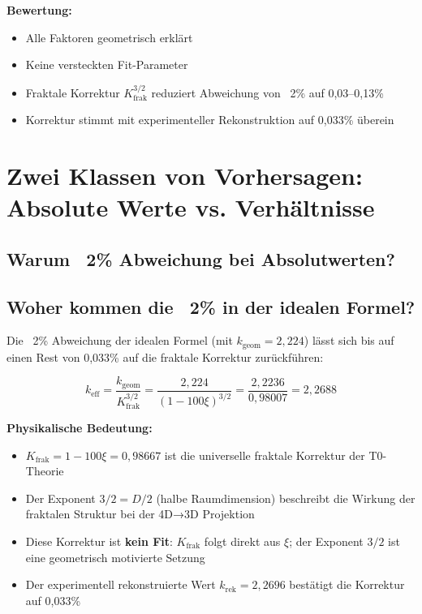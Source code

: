 	\textbf{Bewertung:}
	\begin{itemize}
		\item \checkmark{} Alle Faktoren geometrisch erklärt
		\item \checkmark{} Keine versteckten Fit-Parameter
		\item \checkmark{} Fraktale Korrektur $K_\text{frak}^{3/2}$ reduziert Abweichung von ~2\% auf 0{,}03--0{,}13\%
		\item \checkmark{} Korrektur stimmt mit experimenteller Rekonstruktion auf 0{,}033\% überein
	\end{itemize}
	\section{Zwei Klassen von Vorhersagen: Absolute Werte vs. Verhältnisse}
	
	\subsection{Warum ~2\% Abweichung bei Absolutwerten?}
	
	\subsection{Woher kommen die ~2\% in der idealen Formel?}
	
	Die ~2\% Abweichung der idealen Formel (mit $k_\text{geom} = 2{,}224$) lässt sich bis auf einen Rest von 0{,}033\% auf die fraktale Korrektur zurückführen:
	
	\begin{equation}
		k_\text{eff} = \frac{k_\text{geom}}{K_\text{frak}^{3/2}} = \frac{2{,}224}{(1-100\xi)^{3/2}} = \frac{2{,}2236}{0{,}98007} = 2{,}2688
	\end{equation}
	
	\textbf{Physikalische Bedeutung:}
	\begin{itemize}
		\item $K_\text{frak} = 1 - 100\xi = 0{,}98667$ ist die universelle fraktale Korrektur der T0-Theorie
		\item Der Exponent $3/2 = D/2$ (halbe Raumdimension) beschreibt die Wirkung der fraktalen Struktur bei der 4D→3D Projektion
		\item Diese Korrektur ist \textbf{kein Fit}: $K_\text{frak}$ folgt direkt aus $\xi$; der Exponent $3/2$ ist eine geometrisch motivierte Setzung
		\item Der experimentell rekonstruierte Wert $k_\text{rek} = 2{,}2696$ bestätigt die Korrektur auf 0{,}033\%
	\end{itemize}
	
